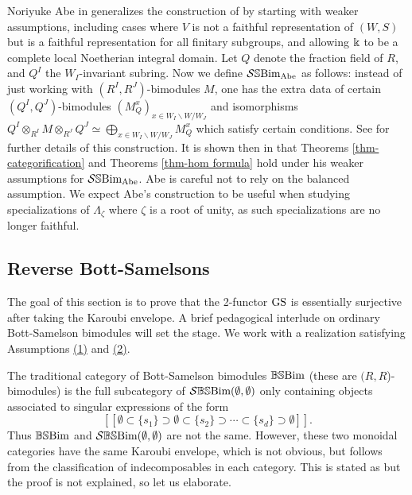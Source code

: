 \begin{remark}\label{rmk-Abe SSBim}
 Noriyuke Abe in \cite{Abe} generalizes the construction of \cite{WillSingular} by starting with weaker assumptions, including cases where $V$ is not a faithful representation of $(W,S)$ but is a faithful representation for all finitary subgroups, and allowing $\Bbbk$ to be a complete local Noetherian integral domain.
 Let $Q$ denote the fraction field of $R$, and $Q^I$ the $W_I$-invariant subring. 
 Now we define $\mathcal{S}\mathbb{S}\text{Bim}_{\operatorname{Abe}}$  as follows: instead of just working with $(R^I,R^J)$-bimodules $M$, one has the extra data of certain $(Q^I,Q^J)$-bimodules $(M_Q^x)_{x\in W_I\backslash W/W_J}$ and isomorphisms $Q^I\otimes_{R^I}M\otimes_{R^J}Q^J\simeq \bigoplus_{x\in W_I\backslash W/W_J}M_Q^x $ which satisfy certain conditions. See \cite[section 2]{Abe} for further details of this construction. 
 It is shown then in \cite{Abe} that Theorems \ref{thm-categorification} and Theorems \ref{thm-hom formula} hold under his weaker assumptions for $\mathcal{S}\mathbb{S}\text{Bim}_{\operatorname{Abe}}$. 
 Abe is careful not to rely on the balanced assumption. We expect Abe's construction to be useful when studying specializations of $\Lambda_{\zeta}$ where $\zeta$ is a root of unity, as such specializations are no longer faithful.
\end{remark}







\subsection{Reverse Bott-Samelsons}\label{subsec reverse bott-samelsons}

The goal of this section is to prove that the 2-functor $\operatorname{GS}$ is essentially surjective after taking the Karoubi envelope. A brief pedagogical interlude on ordinary Bott-Samelson bimodules will set the stage. We work with a realization satisfying Assumptions \hyperref[assumption 1]{(1)} and \hyperref[assumption 2]{(2)}.

The traditional category of Bott-Samelson bimodules $\mathbb{BS}\text{Bim}$ (these are $(R,R$)-bimodules) is the full subcategory of $\mathcal{S}\mathbb{BS}\text{Bim}(\emptyset, \emptyset)$ only containing objects associated to singular expressions of the form 
\begin{equation} \label{ordinaryexp} [[\emptyset \subset \{s_1\} \supset \emptyset \subset \{s_2\} \supset \cdots \subset \{s_d\} \supset \emptyset]] .\end{equation}
Thus $\mathbb{BS}\text{Bim}$ and $\mathcal{S}\mathbb{BS}\text{Bim}(\emptyset, \emptyset)$ are not the same. 
However, these two monoidal categories have the same Karoubi envelope, which is not obvious, but follows from the classification of indecomposables in each category. This is stated as \cite[Theorem 24.12]{EMTW} but the proof is not explained, so let us elaborate.

